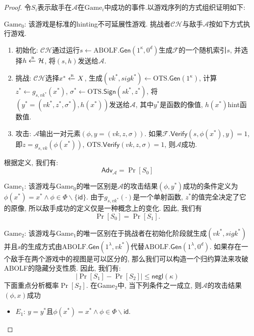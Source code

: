 \begin{proof}
令$S_i$表示敌手在$\mathcal{A}$在$\text{Game}_i$中成功的事件.以游戏序列的方式组织证明如下:
\begin{trivlist}
\item $\text{Game}_0$: 该游戏是标准的hinting不可延展性游戏. 挑战者$\mathcal{CH}$与敌手$\mathcal{A}$按如下方式执行游戏. 
\begin{enumerate}
	\item 初始化: $\mathcal{CH}$通过运行$s \leftarrow \text{ABOLF}.\mathsf{Gen}(1^\kappa, 0^d)$生成$\mathcal{F}$的一个随机索引$s$, 并选择$h \xleftarrow{\textup{\tiny R}} \mathcal{H}$, 将$(s, h)$发送给$\mathcal{A}$. 

    \item 挑战: $\mathcal{CH}$选择$x^* \xleftarrow{\textup{\tiny R}} X$, 生成$(vk^*, sigk^*) \leftarrow \text{OTS}.\mathsf{Gen}(1^\kappa)$, 计算$z^* \leftarrow g_{s, vk^*}(x^*)$, $\sigma^* \leftarrow \text{OTS}.\mathsf{Sign}(sk^*, z^*)$, 将$(y^* = (vk^*, z^*, \sigma^*), h(x^*))$发送给$\mathcal{A}$, 其中$y^*$是函数的像值, $h(x^*)$hint函数值. 

	\item 攻击: $\mathcal{A}$输出一对元素$(\phi, y = (vk, z, \sigma))$. 如果$\mathcal{F}.\mathsf{Verify}(s, \phi(x^*), y) = 1$, 即$z = g_{s, vk}(\phi(x^*))$, $\text{OTS}.\mathsf{Verify}(vk, z, \sigma) = 1$, 则$\mathcal{A}$成功.
\end{enumerate}
根据定义, 我们有: 
\begin{equation*}
	\mathsf{Adv}_\mathcal{A} = \Pr[S_0]
\end{equation*}

\item $\text{Game}_1$: 该游戏与$\text{Game}_0$的唯一区别是$\mathcal{A}$的攻击结果$(\phi, y^*)$成功的条件定义为$\phi(x^*) = x^* \wedge \phi \in \Phi \backslash \{\mathsf{id}\}$. 由于$g_{s, vk^*}(\cdot)$是一个单射函数, $z^*$的值完全决定了它的原像, 所以敌手成功的定义仅是一种概念上的变化. 因此, 我们有
\begin{equation*}
	\Pr[S_0] = \Pr[S_1].
\end{equation*}   

\item $\text{Game}_2$: 该游戏与$\text{Game}_1$的唯一区别在于挑战者在初始化阶段就生成$(vk^*, sigk^*)$并且$s$的生成方式由$\text{ABOLF}.\mathsf{Gen}(1^\lambda, vk^*)$代替$\text{ABOLF}.\mathsf{Gen}(1^\lambda, 0^d)$. 如果存在一个敌手在两个游戏中的视图是可以区分的, 那么我们可以构造一个归约算法来攻破ABOLF的隐藏分支性质. 因此, 我们有: 
\begin{equation*}
	|\Pr[S_1] - \Pr[S_2]| \leq \mathsf{negl}(\kappa)
\end{equation*}
下面重点分析概率$\Pr[S_2]$. 在$\text{Game}_2$中, 当下列条件之一成立, 则$\mathcal{A}$的攻击结果$(\phi, x)$成功
\begin{itemize} \itemsep 1pt \parskip 0pt \parsep 0pt
	\item $E_1$: $y = y^*$且$\phi(x^*) = x^* \wedge \phi \in \Phi \backslash \mathsf{id}$. 


\end{itemize}
\end{trivlist}
\end{proof}
